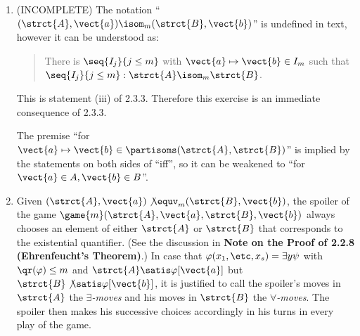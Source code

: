 \begin{enumerate}[1.]
%
\item {} (INCOMPLETE)
The notation ``$(\strct{A}, \vect{a}) \isom_m (\strct{B}, \vect{b})$'' is undefined in text, however it can be understood as:
\begin{quote}
There is $\seq{I_j}{j \leq m}$ with $\vect{a} \mapsto \vect{b} \in I_m$ such that $\seq{I_j}{j \leq m} : \strct{A} \isom_m \strct{B}$.
\end{quote}
This is statement (iii) of 2.3.3. Therefore this exercise is an immediate consequence of 2.3.3.
\begin{remark}
The premise ``for $\vect{a} \mapsto \vect{b} \in \partisoms(\strct{A}, \strct{B})$'' is implied by the statements on both sides of ``iff'', so it can be weakened to ``for $\vect{a} \in A, \vect{b} \in B$''.
\end{remark}
%
\item {} Given $(\strct{A}, \vect{a}) \not\equv_m (\strct{B}, \vect{b})$, the spoiler of the game $\game{m}(\strct{A}, \vect{a}, \strct{B}, \vect{b})$ always chooses an element of either $\strct{A}$ or $\strct{B}$ that corresponds to the existential quantifier. (See the discussion in \textbf{Note on the Proof of 2.2.8 (Ehrenfeucht’s Theorem)}.) In case that $\varphi(x_1, \etc, x_s) = \exists y \psi$ with $\qr(\varphi) \leq m$ and $\strct{A} \satis \varphi[\vect{a}]$ but $\strct{B} \not\satis \varphi[\vect{b}]$, it is justified to call the spoiler's moves in $\strct{A}$ the \emph{$\exists$-moves} and his moves in $\strct{B}$ the \emph{$\forall$-moves}. The spoiler then makes his successive choices accordingly in his turns in every play of the game.
%
\end{enumerate}


